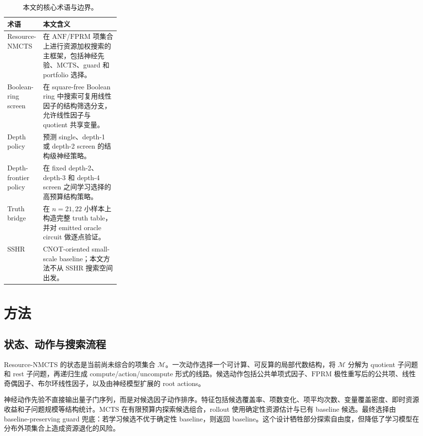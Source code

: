 \documentclass[UTF8,fontset=macnew,11pt]{ctexart}
\newcommand{\method}{Resource-NMCTS}
\newcommand{\screen}{Boolean-ring screen}
\newcommand{\anf}{\ensuremath{\mathrm{ANF}}}
\newcommand{\fprm}{\ensuremath{\mathrm{FPRM}}}
\newcommand{\mcts}{\ensuremath{\mathrm{MCTS}}}
\begin{document}
\begin{table}[t]
\centering
\small
\caption{本文的核心术语与边界。}
\label{tab:terms}
\begin{tabularx}{\linewidth}{>{\raggedright\arraybackslash}p{0.27\linewidth}>{\raggedright\arraybackslash}X}
\toprule
术语 & 本文含义 \\
\midrule
\method{} & 在 \anf{}/\fprm{} 项集合上进行资源加权搜索的主框架，包括神经先验、\mcts{}、guard 和 portfolio 选择。 \\
\screen{} & 在 square-free Boolean ring 中搜索可复用线性因子的结构筛选分支，允许线性因子与 quotient 共享变量。 \\
Depth policy & 预测 single、depth-1 或 depth-2 screen 的结构级神经策略。 \\
Depth-frontier policy & 在 fixed depth-2、depth-3 和 depth-4 screen 之间学习选择的高预算结构策略。 \\
Truth bridge & 在 $n=21,22$ 小样本上构造完整 truth table，并对 emitted oracle circuit 做逐点验证。 \\
SSHR & CNOT-oriented small-scale baseline；本文方法不从 SSHR 搜索空间出发。 \\
\bottomrule
\end{tabularx}
\end{table}

\section{方法}

\subsection{状态、动作与搜索流程}

\method{} 的状态是当前尚未综合的项集合 $\mathcal{M}$。一次动作选择一个可计算、可反算的局部代数结构，将 $\mathcal{M}$ 分解为 quotient 子问题和 rest 子问题，再递归生成 compute/action/uncompute 形式的线路。候选动作包括公共单项式因子、\fprm{} 极性重写后的公共项、线性奇偶因子、布尔环线性因子，以及由神经模型扩展的 root actions。

神经动作先验不直接输出量子门序列，而是对候选因子动作排序。特征包括候选覆盖率、项数变化、项平均次数、变量覆盖密度、即时资源收益和子问题规模等结构统计。\mcts{} 在有限预算内探索候选组合，rollout 使用确定性资源估计与已有 baseline 候选。最终选择由 baseline-preserving guard 兜底：若学习候选不优于确定性 baseline，则返回 baseline。这个设计牺牲部分探索自由度，但降低了学习模型在分布外项集合上造成资源退化的风险。
\end{document}

